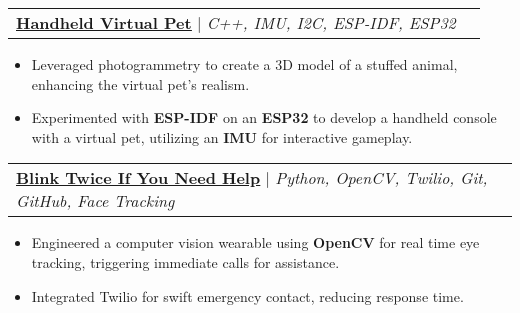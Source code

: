 \documentclass[letterpaper]{article}
\makeatletter
\newcommand{\resumeItem}[1]{
  \item\small{
    {#1 \vspace{-2pt}}
  }
}
\newcommand{\resumeProjectHeading}[2]{
    \item
    \begin{tabular*}{0.97\textwidth}{l@{\extracolsep{\fill}}r}
      \small#1 & #2 \\
    \end{tabular*}\vspace{-7pt}
}
\newcommand{\resumeProjectHeadingWithDetails}[4]{
    \item
    \begin{tabular*}{0.97\textwidth}{l@{\extracolsep{\fill}}r}
      \small#1 & #2 \\[5pt] %
      \textit{\small#3} & \textit{\small #4} \\
    \end{tabular*}\vspace{-7pt}
}
\newcommand{\resumeItemListStart}{\begin{itemize}}
\newcommand{\resumeItemListEnd}{\end{itemize}\vspace{-5pt}}
\makeatother
\begin{document}
\resumeProjectHeading
{\textbf{\href{https://www.gavintranquilino.com/circle-display}{\underline{Handheld Virtual Pet}}} $|$ \emph{C++, IMU, I2C, ESP-IDF, ESP32}}{}
\resumeItemListStart
\resumeItem{Leveraged photogrammetry to create a 3D model of a stuffed animal, enhancing the virtual pet's realism.}

\resumeItem{Experimented with \textbf{ESP-IDF} on an \textbf{ESP32} to develop a handheld console with a virtual pet, utilizing an \textbf{IMU} for interactive gameplay.}
\resumeItemListEnd


\resumeProjectHeading
{\textbf{\href{https://devpost.com/software/blink-twice-if-you-need-help}{\underline{Blink Twice If You Need Help}}} $|$ \emph{Python, OpenCV, Twilio, Git, GitHub, Face Tracking}}{}
\resumeItemListStart
\resumeItem{Engineered a computer vision wearable using \textbf{OpenCV} for real time eye tracking, triggering immediate calls for assistance.}
\resumeItem{Integrated Twilio for swift emergency contact, reducing response time.}
\resumeItemListEnd


\end{document}
